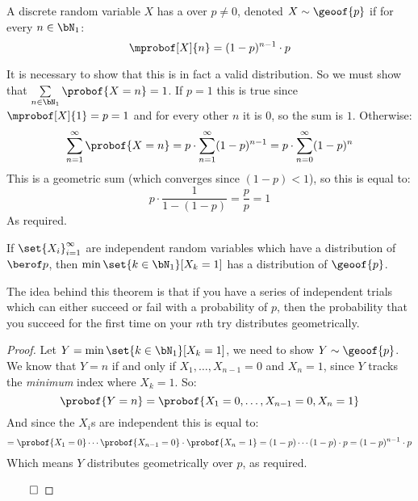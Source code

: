 \begin{defn*}

	A discrete random variable $X$ has a  over $p\neq0$,
	denoted $X\sim\geoof{p}$ if for every $n\in\bN_1$:
	\[ \mprobof[X]{n} = (1-p)^{n-1}\cdot p \]

\end{defn*}

\begin{note}

	It is necessary to show that this is in fact a valid distribution.
	So we must show that $\sum\limits_{n\in\bN_1}\probof{X=n}=1$.
	If $p=1$ this is true since $\mprobof[X]{1}=p=1$ and for every other $n$ it is $0$, so the sum is $1$.
	Otherwise:
	\[ \sum_{n=1}^\infty\probof{X=n} = p\cdot\sum_{n=1}^\infty(1-p)^{n-1} = p\cdot\sum_{n=0}^\infty(1-p)^n \]
	This is a geometric sum (which converges since $(1-p)<1$), so this is equal to:
	\[ p\cdot\frac{1}{1-(1-p)} = \frac pp = 1 \]
	As required.

\end{note}

\begin{thrm*}

	If $\set{X_i}_{i=1}^\infty$ are independent random variables which have a distribution of $\berof p$, then
	$\min\set{k\in\bN_1}[X_k=1]$ has a distribution of $\geoof{p}$.

\end{thrm*}

The idea behind this theorem is that if you have a series of independent trials which can either succeed or fail with a
probability of $p$, then the probability that you succeed for the first time on your $n$th try distributes geometrically.

\begin{proof}

	Let $Y=\min\set{k\in\bN_1}[X_k=1]$, we need to show $Y\sim\geoof{p}$.
	We know that $Y=n$ if and only if $X_1,\dots,X_{n-1}=0$ and $X_n=1$, since $Y$ tracks the \emph{minimum} index where
	$X_k=1$.
	So:
	\[ \probof{Y=n} = \probof{X_1=0,\dots,X_{n-1}=0, X_n=1} \]
	And since the $X_i$s are independent this is equal to:
	\[ = \probof{X_1=0}\cdots\probof{X_{n-1}=0}\cdot\probof{X_n=1} = (1-p)\cdots(1-p)\cdot p = (1-p)^{n-1}\cdot p \]
	Which means $Y$ distributes geometrically over $p$, as required.

	\hfill$\qed$

\end{proof}

